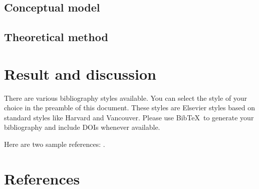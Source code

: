 \documentclass[review]{elsarticle}
\begin{document}
\subsection{Conceptual model}


\subsection{Theoretical method}

\section{Result and discussion}

There are various bibliography styles available. You can select the style of your choice in the preamble of this document. These styles are Elsevier styles based on standard styles like Harvard and Vancouver. Please use Bib\TeX\ to generate your bibliography and include DOIs whenever available.

Here are two sample references: \cite{Feynman1963118,Dirac1953888}.

\section*{References}


\end{document}
